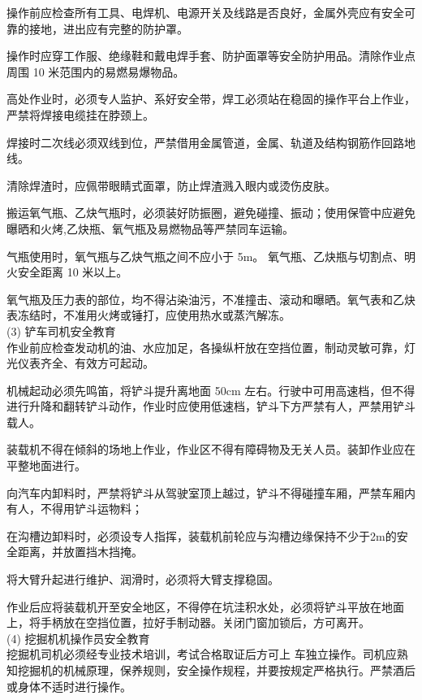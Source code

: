  操作前应检查所有工具、电焊机、电源开关及线路是否良好，金属外壳应有安全可靠的接地，进出应有完整的防护罩。

 操作时应穿工作服、绝缘鞋和戴电焊手套、防护面罩等安全防护用品。清除作业点周围 10 米范围内的易燃易爆物品。

 高处作业时，必须专人监护、系好安全带，焊工必须站在稳固的操作平台上作业，严禁将焊接电缆挂在脖颈上。

 焊接时二次线必须双线到位，严禁借用金属管道，金属、轨道及结构钢筋作回路地线。

 清除焊渣时，应佩带眼睛式面罩，防止焊渣溅入眼内或烫伤皮肤。

 搬运氧气瓶、乙炔气瓶时，必须装好防振圈，避免碰撞、振动；使用保管中应避免曝晒和火烤,乙炔瓶、氧气瓶及易燃物品等严禁同车运输。

 气瓶使用时，氧气瓶与乙炔气瓶之间不应小于 5m。 氧气瓶、乙炔瓶与切割点、明火安全距离 10 米以上。

 氧气瓶及压力表的部位，均不得沾染油污，不准撞击、滚动和曝晒。氧气表和乙炔表冻结时，不准用火烤或锤打，应使用热水或蒸汽解冻。 \\

(3) 铲车司机安全教育\\

 作业前应检查发动机的油、水应加足，各操纵杆放在空挡位置，制动灵敏可靠，灯光仪表齐全、有效方可起动。

 机械起动必须先鸣笛，将铲斗提升离地面 50cm 左右。行驶中可用高速档，但不得进行升降和翻转铲斗动作，作业时应使用低速档，铲斗下方严禁有人，严禁用铲斗载人。

 装载机不得在倾斜的场地上作业，作业区不得有障碍物及无关人员。装卸作业应在平整地面进行。

 向汽车内卸料时，严禁将铲斗从驾驶室顶上越过，铲斗不得碰撞车厢，严禁车厢内有人，不得用铲斗运物料；

在沟槽边卸料时，必须设专人指挥，装载机前轮应与沟槽边缘保持不少于2m的安全距离，并放置挡木挡掩。

 将大臂升起进行维护、润滑时，必须将大臂支撑稳固。

 作业后应将装载机开至安全地区，不得停在坑洼积水处，必须将铲斗平放在地面上，将手柄放在空挡位置，拉好手制动器。关闭门窗加锁后，方可离开。\\


(4) 挖掘机机操作员安全教育\\

 挖掘机司机必须经专业技术培训，考试合格取证后方可上
车独立操作。司机应熟知挖掘机的机械原理，保养规则，安全操作规程，并要按规定严格执行。严禁酒后或身体不适时进行操作。

